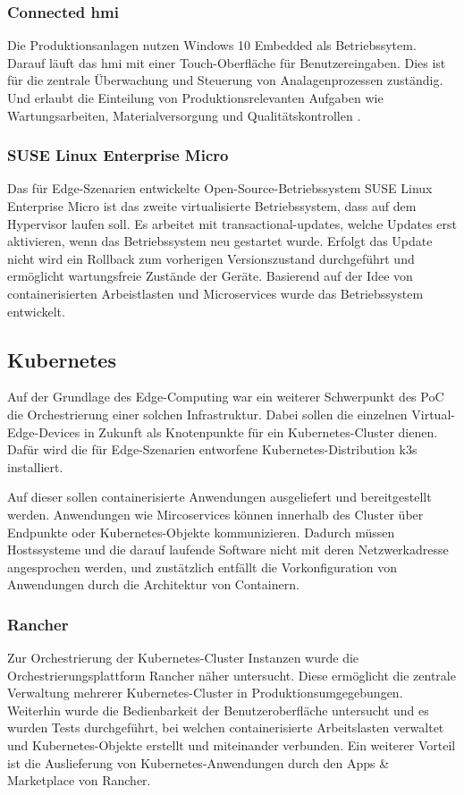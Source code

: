 \subsubsection{Connected \ac{hmi}}
Die Produktionsanlagen nutzen Windows 10 Embedded als Betriebssytem.
Darauf läuft das \acs{hmi} mit einer Touch-Oberfläche für Benutzereingaben.
Dies ist für die zentrale Überwachung und Steuerung von Analagenprozessen zuständig.
Und erlaubt die Einteilung von Produktionsrelevanten Aufgaben wie Wartungsarbeiten, Materialversorgung und Qualitätskontrollen \cite{hmi}.

\subsubsection{SUSE Linux Enterprise Micro}
Das für Edge-Szenarien entwickelte Open-Source-Betriebssystem SUSE Linux Enterprise Micro ist das zweite virtualisierte Betriebssystem, dass auf dem Hypervisor laufen soll.
Es arbeitet mit transactional-updates, welche Updates erst aktivieren, wenn das Betriebssystem neu gestartet wurde. 
Erfolgt das Update nicht wird ein Rollback zum vorherigen Versionszustand durchgeführt und ermöglicht wartungsfreie Zustände der Geräte.
Basierend auf der Idee von containerisierten Arbeistlasten und Microservices wurde das Betriebssystem entwickelt.


\subsection{Kubernetes}
Auf der Grundlage des Edge-Computing war ein weiterer Schwerpunkt des PoC die Orchestrierung einer solchen Infrastruktur. 
Dabei sollen die einzelnen Virtual-Edge-Devices in Zukunft als Knotenpunkte für ein Kubernetes-Cluster dienen. 
Dafür wird die für Edge-Szenarien entworfene Kubernetes-Distribution k3s installiert.

Auf dieser sollen containerisierte Anwendungen ausgeliefert und bereitgestellt werden.
Anwendungen wie Mircoservices können innerhalb des Cluster über Endpunkte oder Kubernetes-Objekte kommunizieren.
Dadurch müssen Hostssysteme und die darauf laufende Software nicht mit deren Netzwerkadresse angesprochen werden,
und zustätzlich entfällt die Vorkonfiguration von Anwendungen durch die Architektur von Containern.


\subsubsection{Rancher}
Zur Orchestrierung der Kubernetes-Cluster Instanzen wurde die Orchestrierungsplattform Rancher näher untersucht. 
Diese ermöglicht die zentrale Verwaltung mehrerer Kubernetes-Cluster in Produktionsumgegebungen.
Weiterhin wurde die Bedienbarkeit der Benutzeroberfläche untersucht und es wurden Tests durchgeführt, bei welchen
containerisierte Arbeitslasten verwaltet und Kubernetes-Objekte erstellt und miteinander verbunden.
Ein weiterer Vorteil ist die Auslieferung von Kubernetes-Anwendungen durch den Apps \& Marketplace von Rancher. 

